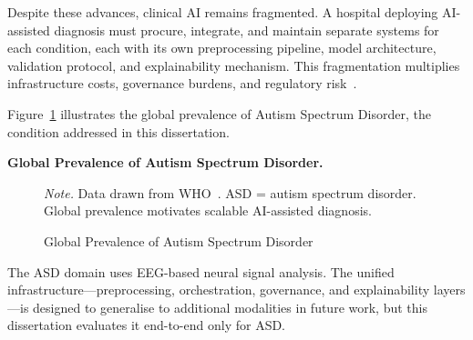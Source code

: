 Despite these advances, clinical AI remains fragmented. A hospital deploying AI-assisted diagnosis must procure, integrate, and maintain separate systems for each condition, each with its own preprocessing pipeline, model architecture, validation protocol, and explainability mechanism. This fragmentation multiplies infrastructure costs, governance burdens, and regulatory risk~\cite{craik2019eeg, kelly2019healthcare}.

Figure~\ref{fig:health_burden} illustrates the global prevalence of Autism Spectrum Disorder, the condition addressed in this dissertation.


\noindent\textbf{Global Prevalence of Autism Spectrum Disorder.}

\begin{figure}[!htbp]
\caption[Global Prevalence of ASD]{Global Prevalence of Autism Spectrum Disorder}
\label{fig:health_burden}
\vspace{0.5em}
\noindent\textit{Note.} Data drawn from WHO~\cite{who2023asd}. ASD = autism spectrum disorder. Global prevalence motivates scalable AI-assisted diagnosis.
\end{figure}

The ASD domain uses EEG-based neural signal analysis. The unified infrastructure---preprocessing, orchestration, governance, and explainability layers---is designed to generalise to additional modalities in future work, but this dissertation evaluates it end-to-end only for ASD.

